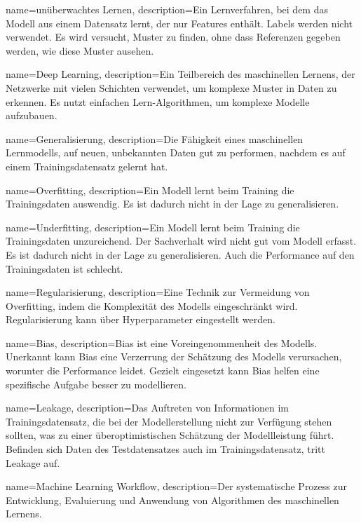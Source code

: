 {
        name=unüberwachtes Lernen,
        description={Ein Lernverfahren,  bei dem das Modell aus einem Datensatz lernt, der nur Features enthält. Labels werden nicht verwendet. Es wird versucht, Muster zu finden, ohne dass Referenzen gegeben werden, wie diese Muster ausehen.}
}

{
        name=Deep Learning,
        description={Ein Teilbereich des maschinellen Lernens, der Netzwerke mit vielen Schichten verwendet, um komplexe Muster in Daten zu erkennen. Es nutzt einfachen Lern-Algorithmen, um komplexe Modelle aufzubauen.}
}

{
        name=Generalisierung,
        description={Die Fähigkeit eines maschinellen Lernmodells, auf neuen, unbekannten Daten gut zu performen, nachdem es auf einem Trainingsdatensatz gelernt hat.}
}

{
        name=Overfitting,
        description={Ein Modell lernt beim Training die Trainingsdaten auswendig. Es ist dadurch nicht in der Lage zu generalisieren.}
}

{
        name=Underfitting,
        description={Ein Modell lernt beim Training die Trainingsdaten unzureichend. Der Sachverhalt wird nicht gut vom Modell erfasst. Es ist dadurch nicht in der Lage zu generalisieren. Auch die Performance auf den Trainingsdaten ist schlecht.}
}

{
        name=Regularisierung,
        description={Eine Technik zur Vermeidung von Overfitting, indem die Komplexität des Modells eingeschränkt wird. Regularisierung kann über Hyperparameter eingestellt werden.}
}

{
        name=Bias,
        description={Bias ist eine Voreingenommenheit des Modells. Unerkannt kann Bias eine Verzerrung der Schätzung des Modells verursachen, worunter die Performance leidet. Gezielt eingesetzt kann Bias helfen eine spezifische Aufgabe besser zu modellieren.}
}

{
        name=Leakage,
        description={Das Auftreten von Informationen im Trainingsdatensatz, die bei der Modellerstellung nicht zur Verfügung stehen sollten, was zu einer überoptimistischen Schätzung der Modellleistung führt. Befinden sich Daten des Testdatensatzes auch im Trainingsdatensatz, tritt Leakage auf.}
}

{
        name=Machine Learning Workflow,
        description={Der systematische Prozess zur Entwicklung, Evaluierung und Anwendung von Algorithmen des maschinellen Lernens.}
}

